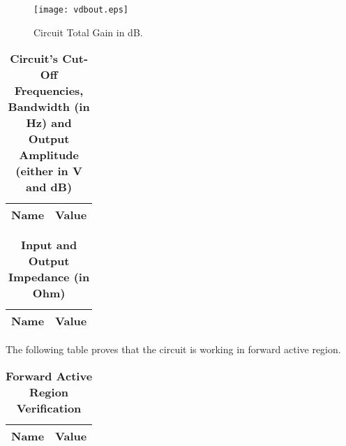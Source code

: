 \begin{figure}[h] 
\centering
\texttt{[image: vdbout.eps]}
\caption{Circuit Total Gain in dB.}
\label{Fig4: SimGaindB}
\end{figure}

\begin{table}[H]
\centering
\begin{tabular}{|l|l|}
\hline
{\bf Name} & {\bf Value} \\ \hline
    
\end{tabular}
\caption{\textbf{Circuit's Cut-Off Frequencies, Bandwidth (in Hz) and Output Amplitude (either in V and dB)}}
\end{table}

\begin{table}[H]
\centering
\begin{tabular}{|l|l|}
\hline
{\bf Name} & {\bf Value} \\ \hline
    
    
\end{tabular}
\caption{\textbf{Input and Output Impedance (in Ohm) }}
\end{table}

The following table proves that the circuit is working in forward active region.

\begin{table}[H]
\centering
\begin{tabular}{|l|l|}
\hline
{\bf Name} & {\bf Value} \\ \hline
    
\end{tabular}
\caption{\textbf{Forward Active Region Verification}}
\end{table}
